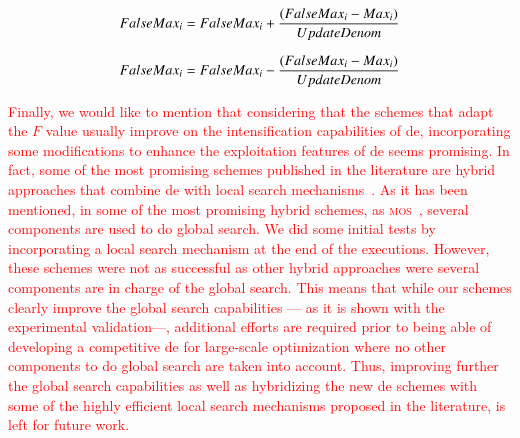 \documentclass[review,3p]{elsarticle}
\newcommand{\DE}{{\sc de}}
\begin{document}
\begin{equation}
	\label{eq:update_max_sum}
		FalseMax_i = FalseMax_i + {{(FalseMax_i - Max_i)}\over{UpdateDenom}}
\end{equation}

\begin{equation}
	\label{eq:update_max_substract}
		FalseMax_i = FalseMax_i - {{(FalseMax_i - Max_i)}\over{UpdateDenom}}
\end{equation}

%
%
%
%
%
%
%

\textcolor{red}{
Finally, we would like to mention that considering that the schemes that adapt the $F$ value usually improve on the intensification capabilities of \DE{},
incorporating some modifications to enhance the exploitation features of \DE{} seems promising.
%
In fact, some of the most promising schemes published in the
literature are hybrid approaches that combine \DE{} with local search mechanisms~\cite{LaTorre:14}.
%
As it has been mentioned, in some of the most promising hybrid schemes, as \textsc{mos}~\cite{LaTorre:11}, several components are used to do global search.
%
We did some initial tests by incorporating a local search mechanism at the end of the executions. 
%
However, these schemes were not as successful as other hybrid approaches were several components are in charge of the global search.
%
This means that while our schemes clearly improve the global search capabilities --- as it is shown with the experimental validation---, 
additional efforts are required prior to being able of developing
a competitive \DE{} for large-scale optimization where no other components to do global search are taken into account.
%
Thus, improving further the global search capabilities as well as 
hybridizing the new \DE{} schemes with some of the highly efficient local search mechanisms proposed
in the literature, is left for future work.
}
\end{document}
